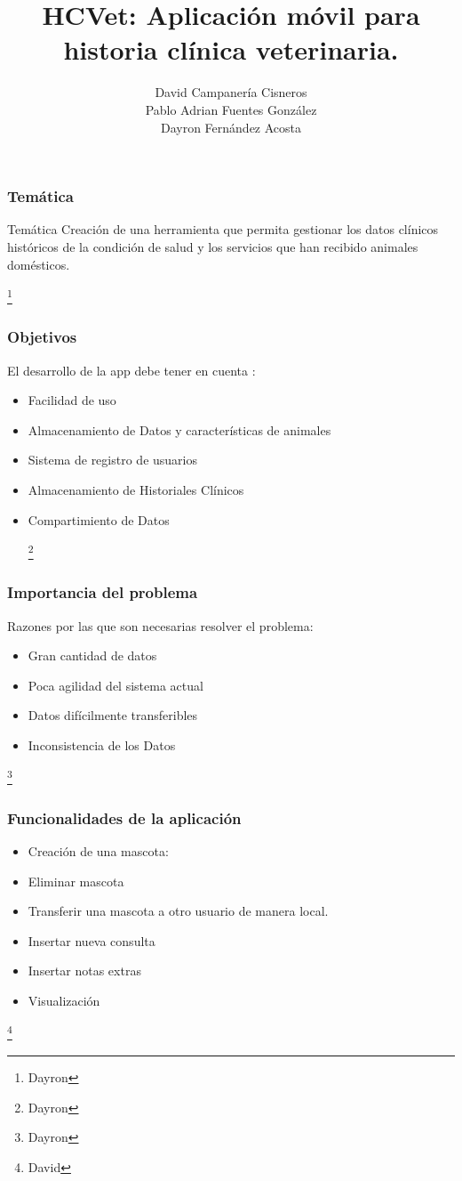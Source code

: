 \documentclass[14pt]{beamer}
\author[Campanería, Fernández, Fuentes]
{David Campanería Cisneros\\Pablo Adrian Fuentes González\\Dayron Fernández Acosta}
\title[Aplicación   HCVet]
{HCVet: Aplicación móvil para historia clínica veterinaria.}
\institute[UH]
{\textbf{Tutores:}\\ José Alejandro Mesejo Chiong\\ José Luis Castañeda Lorenzo}
\begin{document}
\begin{frame}
\titlepage
\end{frame}



\begin{frame}
\frametitle{Temática}
\begin{block}{Temática}
Creación de una herramienta que permita gestionar los datos clínicos históricos de la condición de salud y los servicios que han recibido animales domésticos.

\end{block}

\footnote{Dayron}
\end{frame}


\begin{frame}
\frametitle{Objetivos}
El desarrollo de la app debe tener en cuenta :
\begin{itemize}
\item Facilidad de uso
\item Almacenamiento de Datos y características de animales
\item Sistema de registro de usuarios
\item Almacenamiento de Historiales Clínicos
\item Compartimiento de Datos 

\footnote{Dayron}
\end{itemize}
\end{frame}

\begin{frame}
\frametitle{Importancia del problema}
Razones por las que son necesarias resolver el problema:
\begin{itemize}
\item Gran cantidad de datos
\item Poca agilidad del sistema actual
\item Datos difícilmente transferibles
\item Inconsistencia de los Datos
\end{itemize}
\footnote{Dayron}
\end{frame}

\begin{frame}
\frametitle{Funcionalidades de la aplicación}
\begin{itemize}
\item Creación de una mascota:
\item Eliminar mascota
\item Transferir una mascota a otro usuario de manera local.
\item Insertar nueva consulta
\item Insertar notas extras
\item Visualización
\end{itemize}
\footnote{David}
\end{frame}
\end{document}
